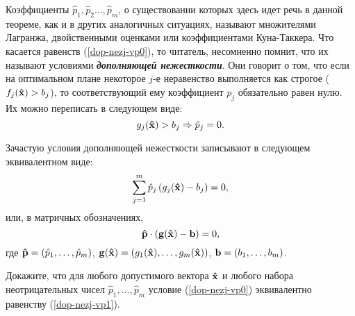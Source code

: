     Коэффициенты $\hat p_1, \hat p_2 \ldots, \hat p_m$, о
    существовании которых здесь идет речь в данной теореме,
    как и в других аналогичных ситуациях, называют множителями
    Лагранжа, двойственными оценками или коэффициентами
    Куна-Таккера. Что касается равенств (\ref{dop-nezj-vp0}), то
    читатель, несомненно помнит, что их называют
    условиями \textbf{\emph{дополняющей
    нежесткости}}. Они говорит о том, что если на
    оптимальном плане некоторое $j$-е неравенство выполняется как
    строгое ($f_j(\mathbf{\hat x}) > b_j$), то соответствующий ему
    коэффициент $p_j$ обязательно равен нулю. Их можно переписать в
    следующем виде:
\[g_j(\mathbf{\hat x}) > b_j \Rightarrow \hat p_j =0.\]

    Зачастую условия дополняющей нежесткости записывают в следующем
    эквивалентном виде:
\begin{equation}\label{dop-nezj-vp1}
    \sum_{j=1}^{m}\hat p_j \,(g_j(\mathbf{\hat x}) - b_j)=0,
\end{equation}
    или, в матричных обозначениях,
    \[\mathbf{\hat p} \cdot (\mathbf{g}(\mathbf{\hat x})- \mathbf{b})=0,\]
    где $\mathbf{\hat p}=(\hat p_{1},\ldots,\hat p_{m})$,
    $\mathbf{g}(\mathbf{\hat x})=(g_{1}(\mathbf{\hat x}),\ldots,g_{m}(\mathbf{\hat x}))$,
    $\mathbf{b}=(b_{1},\ldots,b_{m})$.

\begin{exer}
    Докажите, что для любого допустимого вектора $\mathbf{\hat x}$ и любого набора
    неотрицательных чисел $\hat p_{1},\ldots,\hat p_{m}$ условие
    (\ref{dop-nezj-vp0}) эквивалентно равенству
    (\ref{dop-nezj-vp1}).
\end{exer}



